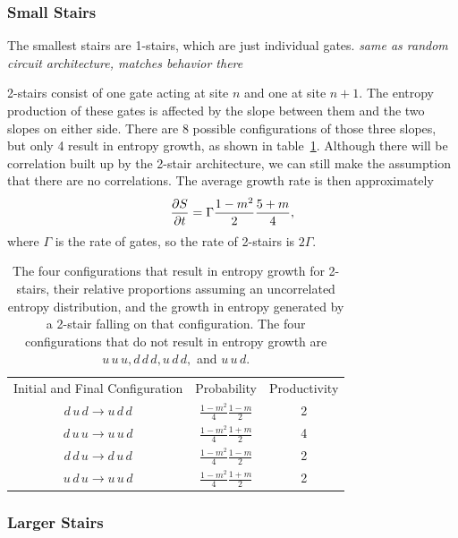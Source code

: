 \subsubsection{Small Stairs} \label{subsub:smallstairs} 

The smallest stairs are 1-stairs, which are just individual gates. \emph{same as random circuit architecture, matches behavior there}

2-stairs consist of one gate acting at site $n$ and one at site $n+1$. The entropy production of these gates is affected by the slope between them and the two slopes on either side. There are 8 possible configurations of those three slopes, but only 4 result in entropy growth, as shown in table~\ref{tab:2stair}. Although there will be correlation built up by the 2-stair architecture, we can still make the assumption that there are no correlations. The average growth rate is then approximately 
\begin{align}
\frac{\partial S}{\partial t} = \Gamma\frac{1-m^2}{2}\frac{5+m}{4},
\end{align}
where $\Gamma$ is the rate of gates, so the rate of 2-stairs is $2\Gamma$.

\begin{table}
	\centering
	\begin{tabular}{ccc}
		Initial and Final 
		Configuration        & Probability         & Productivity\\
		$d\,u\,d\to u\,d\,d$ & $\frac{1-m^2}{4}\frac{1-m}{2}$ & 2\\
		$d\,u\,u\to u\,u\,d$ & $\frac{1-m^2}{4}\frac{1+m}{2}$ & 4\\
		$d\,d\,u\to d\,u\,d$ & $\frac{1-m^2}{4}\frac{1-m}{2}$ & 2\\
		$u\,d\,u\to u\,u\,d$ & $\frac{1-m^2}{4}\frac{1+m}{2}$ & 2
	\end{tabular}
	\caption{The four configurations that result in entropy growth for 2-stairs, their relative proportions assuming an uncorrelated entropy distribution, and the growth in entropy generated by a 2-stair falling on that configuration. The four configurations that do not result in entropy growth are $u\,u\,u, d\,d\,d, u\,d\,d,$ and $u\,u\,d$.}
	\label{tab:2stair}
\end{table}

\subsubsection{Larger Stairs}  \label{subsub:largestairs}

